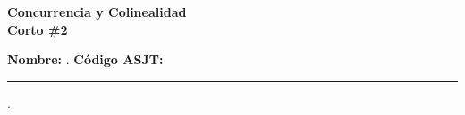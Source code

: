 \begin{center} \textbf
{
    \Large Concurrencia y Colinealidad \\ \vspace{2mm}Corto \#2
}
\end{center}

\textbf{Nombre:} \hrulefill. \textbf{ Código ASJT:} \rule{2cm}{0.1mm}.
\vspace{-4mm}

